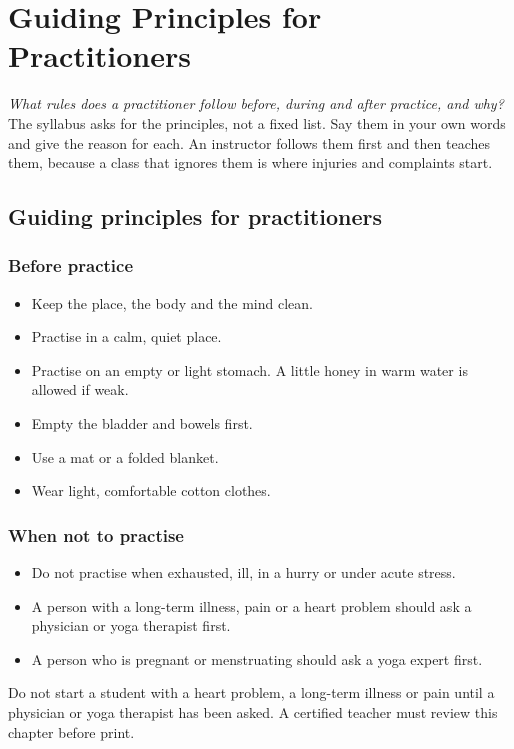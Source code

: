 \chapter{Guiding Principles for Practitioners}
\label{ch:guiding-principles}

\emph{What rules does a practitioner follow before, during and after practice, and why?}
The syllabus asks for the principles, not a fixed list. Say them in your own words and give the reason for each.
An instructor follows them first and then teaches them, because a class that ignores them is where injuries and complaints start.

\section{Guiding principles for practitioners}

\subsection*{Before practice}
\begin{itemize}
\item Keep the place, the body and the mind clean.
\item Practise in a calm, quiet place.
\item Practise on an empty or light stomach. A little honey in warm water is allowed if weak.
\item Empty the bladder and bowels first.
\item Use a mat or a folded blanket.
\item Wear light, comfortable cotton clothes.
\end{itemize}

\subsection*{When not to practise}
\begin{itemize}
\item Do not practise when exhausted, ill, in a hurry or under acute stress.
\item A person with a long-term illness, pain or a heart problem should ask a physician or yoga therapist first.
\item A person who is pregnant or menstruating should ask a yoga expert first.
\end{itemize}

\begin{caution}
Do not start a student with a heart problem, a long-term illness or pain until a physician or yoga therapist has been asked. A certified teacher must review this chapter before print.
\end{caution}

